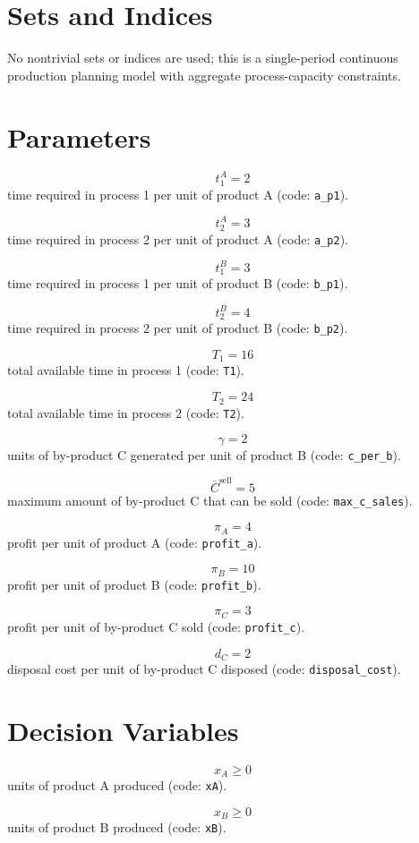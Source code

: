 \section*{Sets and Indices}

No nontrivial sets or indices are used; this is a single-period continuous production planning model with aggregate process-capacity constraints.

\section*{Parameters}

\[
t^{A}_{1}=2
\]
time required in process 1 per unit of product A (code: \texttt{a\_p1}).

\[
t^{A}_{2}=3
\]
time required in process 2 per unit of product A (code: \texttt{a\_p2}).

\[
t^{B}_{1}=3
\]
time required in process 1 per unit of product B (code: \texttt{b\_p1}).

\[
t^{B}_{2}=4
\]
time required in process 2 per unit of product B (code: \texttt{b\_p2}).

\[
T_{1}=16
\]
total available time in process 1 (code: \texttt{T1}).

\[
T_{2}=24
\]
total available time in process 2 (code: \texttt{T2}).

\[
\gamma = 2
\]
units of by-product C generated per unit of product B (code: \texttt{c\_per\_b}).

\[
\overline{C}^{\mathrm{sell}}=5
\]
maximum amount of by-product C that can be sold (code: \texttt{max\_c\_sales}).

\[
\pi_A = 4
\]
profit per unit of product A (code: \texttt{profit\_a}).

\[
\pi_B = 10
\]
profit per unit of product B (code: \texttt{profit\_b}).

\[
\pi_C = 3
\]
profit per unit of by-product C sold (code: \texttt{profit\_c}).

\[
d_C = 2
\]
disposal cost per unit of by-product C disposed (code: \texttt{disposal\_cost}).

\section*{Decision Variables}

\[
x_A \ge 0
\]
units of product A produced (code: \texttt{xA}).

\[
x_B \ge 0
\]
units of product B produced (code: \texttt{xB}).


